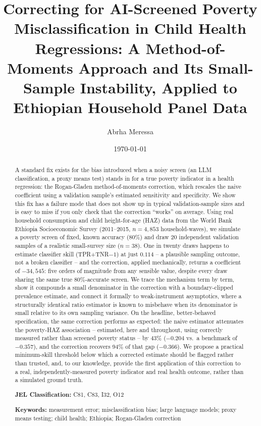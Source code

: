 \documentclass[12pt]{article}
\title{Correcting for AI-Screened Poverty Misclassification in Child Health
Regressions: A Method-of-Moments Approach and Its Small-Sample Instability,
Applied to Ethiopian Household Panel Data}
\author{Abrha Meressa}
\affil{Independent Researcher}
\date{\today}
\begin{document}
\maketitle

\begin{abstract}
\noindent A standard fix exists for the bias introduced when a noisy screen (an LLM classification, a proxy means test) stands in for a true poverty indicator in a health regression: the Rogan-Gladen method-of-moments correction, which rescales the naive coefficient using a validation sample's estimated sensitivity and specificity. We show this fix has a failure mode that does not show up in typical validation-sample sizes and is easy to miss if you only check that the correction ``works'' on average. Using real household consumption and child height-for-age (HAZ) data from the World Bank Ethiopia Socioeconomic Survey (2011--2015, $n=4{,}853$ household-waves), we simulate a poverty screen of fixed, known accuracy (80\%) and draw 20 independent validation samples of a realistic small-survey size ($n=38$). One in twenty draws happens to estimate classifier skill (TPR+TNR$-1$) at just $0.114$ -- a plausible sampling outcome, not a broken classifier -- and the correction, applied mechanically, returns a coefficient of $-34{,}545$: five orders of magnitude from any sensible value, despite every draw sharing the same true 80\%-accurate screen. We trace the mechanism term by term, show it compounds a small denominator in the correction with a boundary-clipped prevalence estimate, and connect it formally to weak-instrument asymptotics, where a structurally identical ratio estimator is known to misbehave when its denominator is small relative to its own sampling variance. On the headline, better-behaved specification, the same correction performs as expected: the naive estimator attenuates the poverty-HAZ association -- estimated, here and throughout, using correctly measured rather than screened poverty status -- by 43\% ($-0.204$ vs.\ a benchmark of $-0.357$), and the correction recovers 94\% of that gap ($-0.366$). We propose a practical minimum-skill threshold below which a corrected estimate should be flagged rather than trusted, and, to our knowledge, provide the first application of this correction to a real, independently-measured poverty indicator and real health outcome, rather than a simulated ground truth.

\medskip
\noindent \textbf{JEL Classification:} C81, C83, I32, O12
\medskip

\noindent \textbf{Keywords:} measurement error; misclassification bias; large language models; proxy means testing; child health; Ethiopia; Rogan-Gladen correction
\end{abstract}
\end{document}
